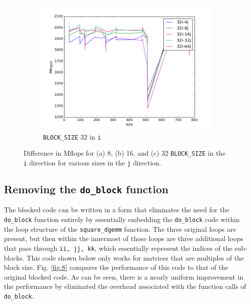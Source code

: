 \documentclass[10pt]{article}
\begin{document}
\begin{figure}[H]
\begin{subfigure}[b]{0.35\textwidth}
        \centering
        \includegraphics[width=\textwidth]{figures/32i-64j.png}
        \caption{{\tt BLOCK\_SIZE} 32 in {\tt i}}
        \end{subfigure}%
        \caption{Difference in Mflops for (a) 8, (b) 16, and (c) 32 {\tt BLOCK\_SIZE} in the {\tt i} direction for various sizes in the {\tt j} direction.}
        \label{fig:5}
\end{figure}

\subsection{Removing the {\tt do\_block} function}
\label{sec:RemoveFuncBlocked}

The blocked code can be written in a form that eliminates the need for the {\tt do\_block} function entirely by essentially embedding the {\tt do\_block} code within the loop structure of the {\tt square\_dgemm} function. The three original loops are present, but then within the innermost of those loops are three additional loops that pass through {\tt ii, jj, kk}, which essentially represent the indices of the sub-blocks. This code shown below only works for matrices that are multiples of the block size. Fig. \ref{fig:8} compares the performance of this code to that of the original blocked code. As can be seen, there is a nearly uniform improvement in the performance by eliminated the overhead associated with the function calls of {\tt do\_block}.
\end{document}
